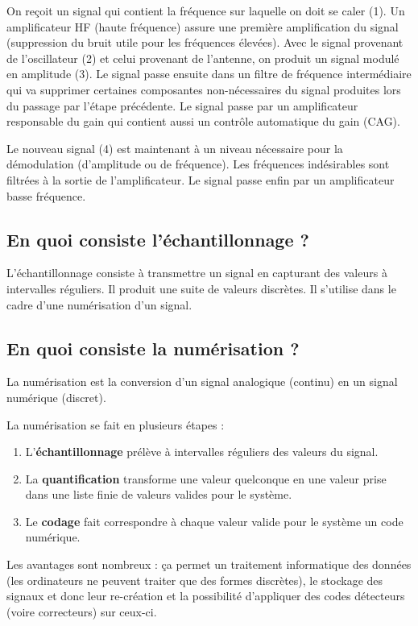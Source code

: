 On reçoit un signal qui contient la fréquence sur laquelle on doit se caler (1). Un amplificateur HF (haute fréquence) assure une première amplification du signal (suppression du bruit utile pour les fréquences élevées). Avec le signal provenant de l'oscillateur (2) et celui provenant de l'antenne, on produit un signal modulé en amplitude (3). Le signal passe ensuite dans un filtre de fréquence intermédiaire qui va supprimer certaines composantes non-nécessaires du signal produites lors du passage par l'étape précédente. Le signal passe par un amplificateur responsable du gain qui contient aussi un contrôle automatique du gain (CAG).

Le nouveau signal (4) est maintenant à un niveau nécessaire pour la démodulation (d'amplitude ou de fréquence). Les fréquences indésirables sont filtrées à la sortie de l'amplificateur. Le signal passe enfin par un amplificateur basse fréquence.

\subsection{En quoi consiste l'échantillonnage ?}

L'échantillonnage consiste à transmettre un signal en capturant des valeurs à intervalles réguliers. Il produit une suite de valeurs discrètes. Il s'utilise dans le cadre d'une numérisation d'un signal.  

\subsection{En quoi consiste la numérisation ?}

La numérisation est la conversion d'un signal analogique (continu) en un signal numérique (discret).

La numérisation se fait en plusieurs étapes :
\begin{enumerate}
    \item L'\textbf{échantillonnage} prélève à intervalles réguliers des valeurs du signal.
    \item La \textbf{quantification} transforme une valeur quelconque en une valeur prise dans une liste finie de valeurs valides pour le système.
    \item Le \textbf{codage} fait correspondre à chaque valeur valide pour le système un code numérique.
\end{enumerate}

Les avantages sont nombreux : ça permet un traitement informatique des données (les ordinateurs ne peuvent traiter que des formes discrètes), le stockage des signaux et donc leur re-création et la possibilité d'appliquer des codes détecteurs (voire correcteurs) sur ceux-ci.

